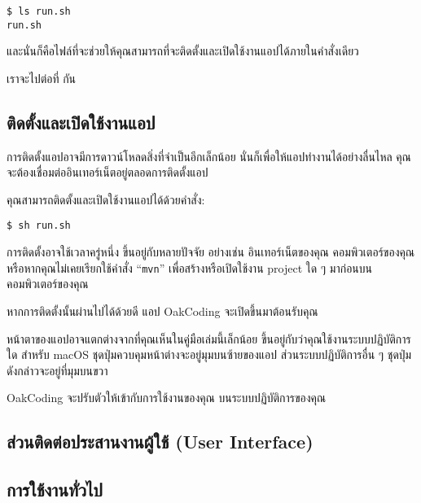 \begin{lstlisting}[numbers=none]
$ ls run.sh
run.sh
\end{lstlisting}

และนั่นก็คือไฟล์ที่จะช่วยให้คุณสามารถที่จะติดตั้งและเปิดใช้งานแอปได้ภายในคำสั่งเดียว

เราจะไปต่อที่  กัน

\pagebreak[4]

\subsection{ติดตั้งและเปิดใช้งานแอป}\label{subsec:launch-app}

\rule{0em}{1ex}

การติดตั้งแอปอาจมีการดาวน์โหลดสิ่งที่จำเป็นอีกเล็กน้อย
นั่นก็เพื่อให้แอปทำงานได้อย่างลื่นไหล
คุณจะต้องเชื่อมต่ออินเทอร์เน็ตอยู่ตลอดการติดตั้งแอป

คุณสามารถติดตั้งและเปิดใช้งานแอปได้ด้วยคำสั่ง:

\begin{lstlisting}[numbers=none]
$ sh run.sh
\end{lstlisting}

การติดตั้งอาจใช้เวลาครู่หนึ่ง ขึ้นอยู่กับหลายปัจจัย อย่างเช่น อินเทอร์เน็ตของคุณ
คอมพิวเตอร์ของคุณ หรือหากคุณไม่เคยเรียกใช้คำสั่ง ``\texttt{mvn}'' เพื่อสร้างหรือเปิดใช้งาน
project ใด ๆ มาก่อนบนคอมพิวเตอร์ของคุณ

หากการติดตั้งนั้นผ่านไปได้ด้วยดี แอป OakCoding จะเปิดขึ้นมาต้อนรับคุณ


หน้าตาของแอปอาจแตกต่างจากที่คุณเห็นในคู่มือเล่มนี้เล็กน้อย
ขึ้นอยู่กับว่าคุณใช้งานระบบปฏิบัติการใด สำหรับ macOS ชุดปุ่มควบคุมหน้าต่างจะอยู่มุมบนซ้ายของแอป
ส่วนระบบปฏิบัติการอื่น ๆ ชุดปุ่มดังกล่าวจะอยู่ที่มุมบนขวา

OakCoding จะปรับตัวให้เข้ากับการใช้งานของคุณ บนระบบปฏิบัติการของคุณ

\pagebreak[4]

\subsection{ส่วนติดต่อประสานงานผู้ใช้ (User Interface)}\label{subsec:intro-ui}

\blindtext[3]

\pagebreak[4]

\subsection{การใช้งานทั่วไป}\label{subsec:general-usage}

